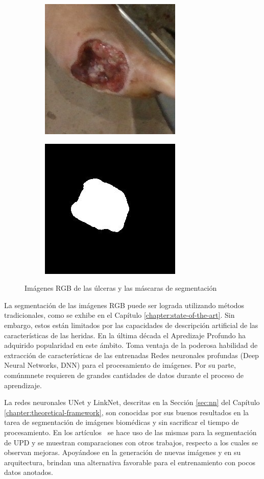 {\begin{figure}[ht]
	\centering
	\begin{subfigure}
		\centering
		\includegraphics[width=.3\linewidth]{./Graphics/dfu.jpg}
	\end{subfigure}
	\begin{subfigure}
		\centering
		\includegraphics[width=.3\linewidth]{./Graphics/mask.jpg}
	\end{subfigure}
	\caption{Imágenes RGB de las úlceras y las máscaras de segmentación}
	\label{fig:dfuseg}
\end{figure}

La segmentación de las imágenes RGB puede ser lograda utilizando métodos tradicionales, como se exhibe en el Capítulo \ref{chapter:state-of-the-art}. Sin embargo, estos están limitados por las capacidades de descripción artificial de las características de las heridas. En la última década el Apredizaje Profundo ha adquirido popularidad en este ámbito. Toma ventaja de la poderosa habilidad de extracción de características de las entrenadas Redes neuronales profundas (Deep Neural Networks, DNN) para el procesamiento de imágenes. Por su parte, comúnmnete requieren de grandes cantidades de datos durante el proceso de aprendizaje.

La redes neuronales UNet y LinkNet, descritas en la Sección \ref{sec:nn} del Capítulo \ref{chapter:theoretical-framework}, son conocidas por sus buenos resultados en la tarea de segmentación de imágenes biomédicas y sin sacrificar el tiempo de procesamiento. En los artículos~\cite{chino2020segmenting, cui2019diabetic} se hace uso de las mismas para la segmentación de UPD y se muestran comparaciones con otros trabajos, respecto a los cuales se observan mejoras. Apoyándose en la generación de nuevas imágenes y en su arquitectura, brindan una alternativa favorable para el entrenamiento con pocos datos anotados. 

}
